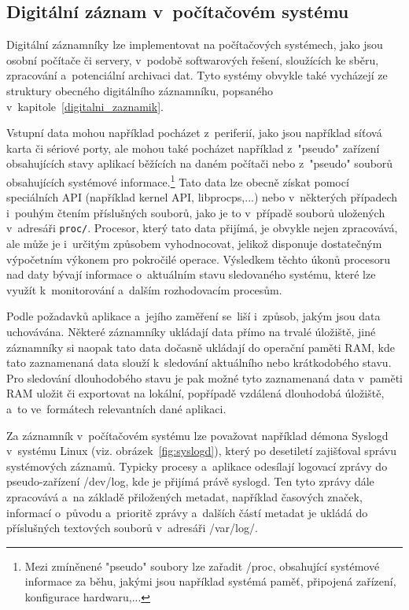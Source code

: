 \newpage

\subsection{Digitální záznam v~počítačovém systému}
Digitální záznamníky lze implementovat na počítačových systémech, jako jsou osobní počítače či servery, v~podobě softwarových řešení, sloužících ke sběru, zpracování a~potenciální archivaci dat. Tyto systémy obvykle také vycházejí ze struktury obecného digitálního záznamníku, popsaného v~kapitole~\ref{digitalni_zaznamik}. 

Vstupní data mohou například pocházet z~periferií, jako jsou například síťová karta či sériové porty, ale mohou také pocházet například z~"pseudo" zařízení obsahujících stavy aplikací běžících na daném počítači nebo z~"pseudo" souborů obsahujících systémové informace.\footnote{Mezi zmíněnené "pseudo" soubory lze zařadit /proc, obsahující systémové informace za běhu, jakými jsou například systémá paměť, připojená zařízení, konfigurace hardwaru,...} Tato data lze obecně získat pomocí speciálních API (například kernel API, libprocps,...) nebo v~některých případech i~pouhým čtením příslušných souborů, jako je to v~případě souborů uložených v~adresáři \texttt{proc/}. Procesor, který tato data přijímá, je obvykle nejen zpracovává, ale může je i~určitým způsobem vyhodnocovat, jelikož disponuje dostatečným výpočetním výkonem pro pokročilé operace. Výsledkem těchto úkonů procesoru nad daty bývají informace o~aktuálním stavu sledovaného systému, které lze využít k~monitorování a~dalším rozhodovacím procesům.~\cite{microsoft_wmi_win32, linux_libprocsp, linux_in_action_log_and_monitoring}

% 
Podle požadavků aplikace a~jejího zaměření se~liší i~způsob, jakým jsou data uchovávána. Některé záznamníky ukládají data přímo na trvalé úložiště, jiné záznamníky si naopak tato data dočasně ukládají do operační paměti RAM, kde tato zaznamenaná data slouží k~sledování aktuálního nebo krátkodobého stavu. Pro sledování dlouhodobého stavu je pak možné tyto zaznamenaná data v~paměti RAM uložit či exportovat na lokální, popřípadě vzdálená dlouhodobá úložiště, a~to ve~formátech relevantních dané aplikaci.

Za záznamník v~počítačovém systému lze považovat například démona Syslogd v~systému Linux (viz. obrázek~\ref{fig:syslogd}), který po desetiletí zajišťoval správu systémových záznamů. Typicky procesy a~aplikace odesílají logovací zprávy do pseudo-zařízení /dev/log, kde je přijímá právě syslogd. Ten tyto zprávy dále zpracovává a~na základě přiložených metadat, například časových značek, informací o~původu a~prioritě zprávy a~dalších částí metadat je ukládá do příslušných textových souborů v~adresáři /var/log/.~\cite{linux_in_action_log_and_monitoring}

